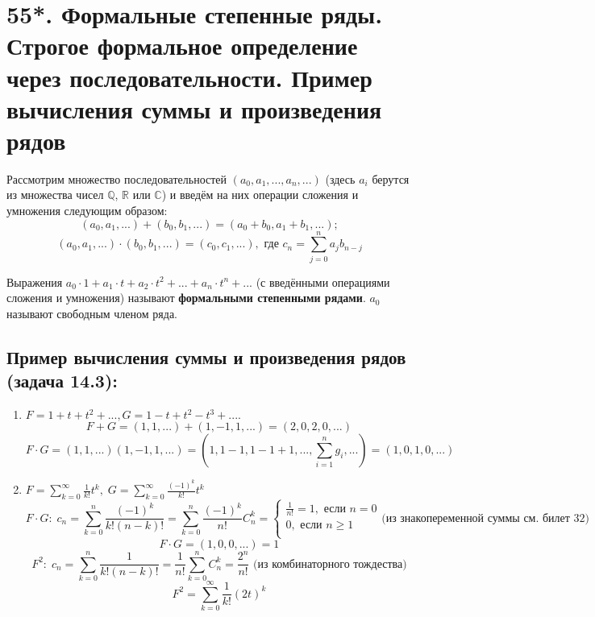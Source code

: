 \section*{55*. Формальные степенные ряды. Строгое формальное определение через последовательности. Пример вычисления суммы и произведения рядов}
\par Рассмотрим множество последовательностей $(a_0, a_1, ..., a_n, ...)$ (здесь $a_i$ берутся из множества
чисел $\mathbb{Q}$, $\mathbb{R}$ или $\mathbb{C}$) и введём на них операции сложения и умножения следующим образом:
$$(a_0, a_1, . . .) + (b_0, b_1, . . .) = (a_0 + b_0, a_1 + b_1, . . .);$$
$$(a_0, a_1, . . .) · (b_0, b_1, . . .) = (c_0, c_1, . . .),\mbox{ где } c_n =\sum\limits_{j=0}^n a_j b_{n-j}$$
\par Выражения $a_0 \cdot 1+a_1 \cdot t+a_2 \cdot t^2+. . .+a_n \cdot t^n+. . .$ (с введёнными операциями сложения и умножения) называют \textbf{формальными степенными рядами}. $a_0$ называют свободным членом ряда.
\subsection*{Пример вычисления суммы и произведения рядов (задача 14.3):}
\begin{enumerate}
    \item $F = 1 + t + t^2 + . . ., G = 1 - t + t^2 - t^3 + . . .. $
    $$F + G=(1, 1, ...) + (1, -1, 1, ...) = (2, 0, 2, 0, ...)$$
    $$F \cdot G=(1, 1, ...)(1, -1, 1, ...)=(1, 1-1, 1-1+1, ..., \sum\limits_{i=1}^n g_i, ...)=(1, 0, 1, 0,...) $$
    \item $F =\sum\limits_{k=0}^{\infty} \frac{1}{k!}t^k, \; G =\sum\limits_{k=0}^{\infty} \frac{(-1)^k}{k!}t^k$
    $$F \cdot G: \; c_n=\sum\limits_{k=0}^n \frac{(-1)^k}{k!(n-k)!}=\sum\limits_{k=0}^n \frac{(-1)^k}{n!} C_n^k=\left\{
\begin{array}{ccc}
\frac{1}{n!}=1, \mbox{ если } n=0\\
0, \mbox{ если } n \geq 1\\
\end{array}
\right. \mbox{(из знакопеременной суммы см. билет 32)}$$
$$F \cdot G = (1, 0, 0, ...)=1$$
$$F^2: \; c_n=\sum\limits_{k=0}^n \frac{1}{k!(n-k)!}=\frac{1}{n!} \sum\limits_{k=0}^n C_n^k=\frac{2^n}{n!} \mbox{ (из комбинаторного тождества)}$$
$$F^2=\sum\limits_{k=0}^{\infty} \frac{1}{k!}(2t)^k$$
\end{enumerate}